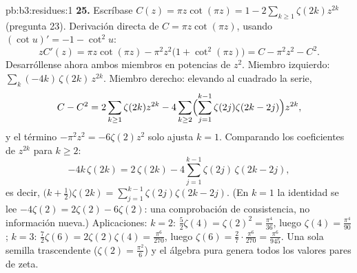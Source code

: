 \begin{solution}{pb:b3:residues:1}
\textbf{25.} Escríbase $C(z) = \pi z\cot(\pi z) = 1 -
2\sum_{k\geq1}\zeta(2k)z^{2k}$ (pregunta 23). Derivación directa de
$C = \pi z\cot(\pi z)$, usando $(\cot u)'
= -1 - \cot^2u$:
\[
zC'(z) = \pi z\cot(\pi z) - \pi^2z^2\bigl(1 +
\cot^2(\pi z)\bigr) = C - \pi^2z^2 - C^2 .
\]
Desarróllense ahora ambos miembros en potencias de $z^2$. Miembro
izquierdo: $\sum_k(-4k)\,\zeta(2k)\,z^{2k}$. Miembro derecho: elevando
al cuadrado la serie,
\[
C - C^2 = 2\sum_{k\geq1}\zeta(2k)z^{2k}
- 4\sum_{k\geq2}\Bigl(\sum_{j=1}^{k-1}\zeta(2j)
\zeta(2k-2j)\Bigr)z^{2k},
\]
y el término $-\pi^2z^2 = -6\zeta(2)z^2$ solo ajusta $k =
1$. Comparando los coeficientes de $z^{2k}$ para $k \geq 2$:
\[
-4k\,\zeta(2k) = 2\,\zeta(2k) -
4\sum_{j=1}^{k-1}\zeta(2j)\,\zeta(2k-2j),
\]
es decir, $\bigl(k + \frac12\bigr)\zeta(2k) =
\sum_{j=1}^{k-1}\zeta(2j)\zeta(2k-2j)$. (En $k = 1$ la identidad se lee
$-4\zeta(2) = 2\zeta(2) - 6\zeta(2)$: una comprobación de consistencia,
no información nueva.) Aplicaciones: $k =
2$: $\frac52\zeta(4) = \zeta(2)^2 = \frac{\pi^4}{36}$, luego
$\zeta(4) = \frac{\pi^4}{90}$; $k = 3$: $\frac72\zeta(6) =
2\zeta(2)\zeta(4) = \frac{\pi^6}{270}$, luego $\zeta(6) =
\frac{2}{7}\cdot\frac{\pi^6}{270} = \frac{\pi^6}{945}$. Una sola semilla
trascendente ($\zeta(2) = \frac{\pi^2}6$) y el álgebra pura genera todos
los valores pares de zeta.
\end{solution}
